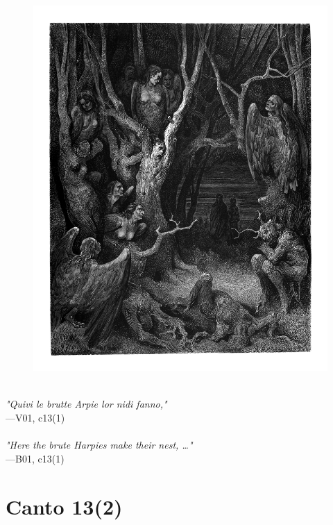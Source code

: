 \documentclass[../Dore_vision.tex]{subfiles}
\begin{document}
\begin{figure}[ht]
\centering
\includegraphics[height=\figsize]{illustrations/book_1/V01, c13(1).jpg}
\end{figure}

\begin{center}
\begin{minipage}{0.8\linewidth}
\textit{\\
"Quivi le brutte Arpie lor nidi fanno,"} \\
—V01, c13(1) \\~\\
\textit{"Here the brute Harpies make their nest, …"} \\
—B01, c13(1)
\end{minipage}
\end{center}

\newpage

\section{Canto 13(2)}
\end{document}
